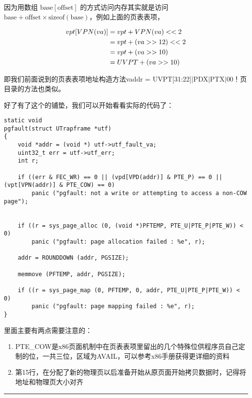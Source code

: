 \documentclass{article}
\begin{document}
\begin{CJK*}{UTF8}{gkai}
因为用数组 $\mathrm{base}[\mathrm{offset}]$ 的方式访问内存其实就是访问$\mathrm{base} + \mathrm{offset} \times \mathrm{sizeof(base)}$，例如上面的页表表项，

\begin{align}
vpt[VPN(va)] &= vpt + VPN(va) << 2 \notag \\
             &= vpt + (va >> 12) << 2 \notag \\
             &= vpt + (va >> 10) \notag \\
             &= UVPT + (va >> 10) \notag  
\end{align}

即我们前面说到的页表表项地址构造方法vaddr = UVPT[31:22]$\left|\right.$PDX$\left|\right.$PTX$\left|\right.$00！页目录的方法也类似。


好了有了这个的铺垫，我们可以开始看看实际的代码了：

\begin{lstlisting}[style=ccode, title={\scriptsize \ttfamily \bfseries lib/fork.c: pgfault()}]
static void
pgfault(struct UTrapframe *utf)
{
    void *addr = (void *) utf->utf_fault_va;
    uint32_t err = utf->utf_err;
    int r;

    if ((err & FEC_WR) == 0 || (vpd[VPD(addr)] & PTE_P) == 0 ||  (vpt[VPN(addr)] & PTE_COW) == 0)
        panic ("pgfault: not a write or attempting to access a non-COW page");


    if ((r = sys_page_alloc (0, (void *)PFTEMP, PTE_U|PTE_P|PTE_W)) < 0)
        panic ("pgfault: page allocation failed : %e", r);

    addr = ROUNDDOWN (addr, PGSIZE);

    memmove (PFTEMP, addr, PGSIZE);

    if ((r = sys_page_map (0, PFTEMP, 0, addr, PTE_U|PTE_P|PTE_W)) < 0)
        panic ("pgfault: page mapping failed : %e", r);
}
\end{lstlisting}

里面主要有两点需要注意的：

\begin{enumerate}
\item{PTE\_COW是x86页面机制中在页表表项里留出的几个特殊位供程序员自己定制的位，一共三位，区域为AVAIL，可以参考x86手册获得更详细的资料}
\item{第15行，在分配了新的物理页以后准备开始从原页面开始拷贝数据时，记得将地址和物理页大小对齐}
\end{enumerate}

\vspace{2em}
\hrule
\vspace{2em}


\end{CJK*}
\end{document}
